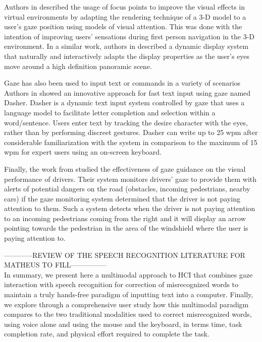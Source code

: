 \documentclass[]{article}
\begin{document}
Authors in \cite{Hillaire2008} described the usage of focus points to improve the visual effects in virtual environments
by adapting the rendering technique of a 3-D model to a user's gaze position using models of visual attention. This was
done with the intention of improving users' sensations during first person navigation in the 3-D environment.
In a similar work, authors in \cite{Rahardja2009} described a dynamic display system that naturally and interactively
adapts the display properties as the user's eyes move around a high definition panoramic scene.


Gaze has also been used to input text or commands in a variety of scenarios \cite{myiwann2011} Authors in
\cite{fasthandsfreewritingbygaze} showed an innovative approach for fast text input using gaze named Dasher. Dasher is a
dynamic text input system controlled by gaze that uses a language model to facilitate letter completion and selection
within a word/sentence. Users enter text by tracking the desire character with the eyes, rather than by performing
discreet gestures. Dasher can write up to 25 wpm after considerable familiarization with the system in comparison to the
maximum of 15 wpm for expert users using an on-screen keyboard.
 

Finally, the work from \cite{Pomarjanschi2012} studied the effectiveness of gaze guidance on the visual performance of drivers.
Their system monitors drivers' gaze to provide them with alerts of potential dangers on the road (obstacles, incoming pedestrians,
nearby cars) if the gaze monitoring system determined that the driver is not paying attention to them. Such a
system detects when the driver is not paying attention to an incoming pedestrians coming from the right and it will
display an arrow pointing towards the pedestrian in the area of the windshield where the user is paying attention to.


------------REVIEW OF THE SPEECH RECOGNITION LITERATURE FOR MATHEUS TO FILL---------------\\


In summary, we present here a multimodal approach to HCI that combines gaze 
interaction with speech recognition for correction of misrecognized words to maintain a truly hands-free paradigm of
inputting text into a computer. Finally, we explore through a comprehensive user study how this multimodal paradigm
compares to the two traditional modalities used to correct misrecognized words, using voice alone and using the mouse
and the keyboard, in terms time, task completion rate, and physical effort required to complete the task.
\end{document}
